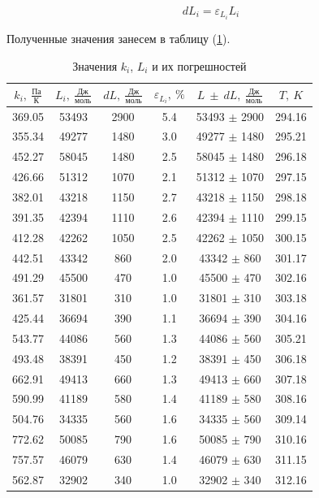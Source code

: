 \documentclass[a4paper,12pt]{article} %
\begin{document}
\begin{equation}
  dL_i = \varepsilon_{L_i} L_i
\end{equation}

Полученные значения занесем в таблицу (\ref{tab:k_i_L}).

\begin{table}[h]
  \centering
  \begin{tabular}{|c|c|c|c||c|c|}
    \hline
    $k_i,\ \frac{\mbox{Па}}{\mbox{К}}$ & $L_i,\ \frac{\mbox{Дж}}{\mbox{моль}}$ & $dL,\ \frac{\mbox{Дж}}{\mbox{моль}}$ & $\varepsilon_{L_i},\ \%$ & $L\ \pm\ dL,\ \frac{\mbox{Дж}}{\mbox{моль}}$ & $T,\ K$ \\
    \hline
    369.05 & 53493 & 2900 & 5.4 & 53493 $\pm$ 2900 & 294.16 \\
    355.34 & 49277 & 1480 & 3.0 & 49277 $\pm$ 1480 & 295.21 \\
    452.27 & 58045 & 1480 & 2.5 & 58045 $\pm$ 1480 & 296.18 \\
    426.66 & 51312 & 1070 & 2.1 & 51312 $\pm$ 1070 & 297.15 \\
    382.01 & 43218 & 1150 & 2.7 & 43218 $\pm$ 1150 & 298.18 \\
    391.35 & 42394 & 1110 & 2.6 & 42394 $\pm$ 1110 & 299.15 \\
    412.28 & 42262 & 1050 & 2.5 & 42262 $\pm$ 1050 & 300.15 \\
    442.51 & 43342 & 860 & 2.0 & 43342 $\pm$ 860 & 301.17 \\
    491.29 & 45500 & 470 & 1.0 & 45500 $\pm$ 470 & 302.16 \\
    361.57 & 31801 & 310 & 1.0 & 31801 $\pm$ 310 & 303.18 \\
    425.44 & 36694 & 390 & 1.1 & 36694 $\pm$ 390 & 304.16 \\
    543.77 & 44086 & 560 & 1.3 & 44086 $\pm$ 560 & 305.21 \\
    493.48 & 38391 & 450 & 1.2 & 38391 $\pm$ 450 & 306.18 \\
    662.91 & 49413 & 660 & 1.3 & 49413 $\pm$ 660 & 307.18 \\
    590.99 & 41189 & 580 & 1.4 & 41189 $\pm$ 580 & 308.16 \\
    504.76 & 34335 & 560 & 1.6 & 34335 $\pm$ 560 & 309.14 \\
    772.62 & 50085 & 790 & 1.6 & 50085 $\pm$ 790 & 310.16 \\
    757.57 & 46079 & 630 & 1.4 & 46079 $\pm$ 630 & 311.15 \\
    562.87 & 32902 & 340 & 1.0 & 32902 $\pm$ 340 & 312.16 \\
    \hline
    \end{tabular}
    \caption{Значения $k_i$, $L_i$ и их погрешностей}
    \label{tab:k_i_L}
\end{table}
\end{document}
